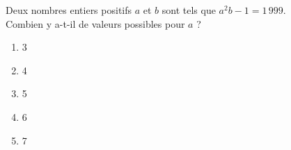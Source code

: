 Deux nombres entiers positifs $a$ et $b$ sont tels que $a^2b-1=1\,999$.
\\Combien y a-t-il de valeurs possibles pour $a$ ?
\begin{multicols}{5}
\begin{enumerate}[A/]
\item 3
\item 4
\item 5
\item 6
\item 7
\end{enumerate}
\end{multicols}